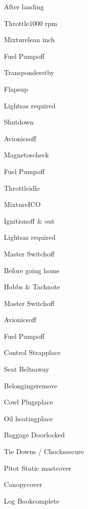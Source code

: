 \begin{multicols}{2}
\begin{checklist}{After landing}
    \item{Throttle}{$1000$ rpm}
    \item{Mixture}{lean  inch}
    \item{Fuel Pump}{off}
    \item{Transponder}{stby}
    \item{Flaps}{up}
    \item{Lights}{as required}
\end{checklist}

\begin{checklist}{Shutdown}
    \item{Avionics}{off}
    \item{Magnetos}{check}
    \item{Fuel Pump}{off}
    \item{Throttle}{idle}
    \item{Mixture}{ICO}
    \item{Ignition}{off \& out}
    \item{Lights}{as required}
    \item{Master Switch}{off}
\end{checklist}

\begin{checklist}{Before going home}
    \item{Hobbs \& Tach}{note}
    \item{Master Switch}{off}
    \item{Avionics}{off}
    \item{Fuel Pump}{off}
    \item{Control Strap}{place}
    \item{Seat Belts}{away}
    \item{Belongings}{remove}
    \item{Cowl Plugs}{place}
    \item{Oil heating}{place}
    \item{Baggage Door}{locked}
    \item{Tie Downs / Chocks}{secure}
    \item{Pitot Static mast}{cover}
    \item{Canopy}{cover}
    \item{Log Book}{complete}
\end{checklist}
\end{multicols}


